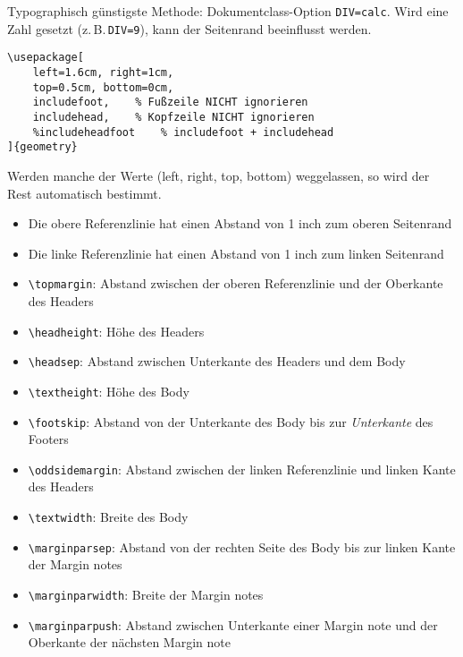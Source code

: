 Typographisch günstigste Methode: Dokumentclass-Option {\green \lstinline|DIV=calc|}.
Wird eine Zahl gesetzt ({z.\,B.\,\green\lstinline|DIV=9|}), kann der Seitenrand beeinflusst werden.


\negAbstand
\begin{lstlisting}
\usepackage[
	left=1.6cm, right=1cm,
	top=0.5cm, bottom=0cm, 
	includefoot,	% Fußzeile NICHT ignorieren
	includehead,	% Kopfzeile NICHT ignorieren
	%includeheadfoot	% includefoot + includehead
]{geometry} 
\end{lstlisting}
Werden manche der Werte (left, right, top, bottom) weggelassen, so wird der Rest automatisch bestimmt.

\label{sec:layout_var}

\footnotesize
\addtolength{\leftmargini}{-10pt}
\begin{itemize}
	\item Die obere Referenzlinie hat einen Abstand von 1 inch zum oberen Seitenrand
	\item Die linke Referenzlinie hat einen Abstand von 1 inch zum linken Seitenrand
	\item \lstinline|\topmargin|: Abstand zwischen der oberen Referenzlinie und der Oberkante des Headers
	\item \lstinline|\headheight|: Höhe des Headers
	\item \lstinline|\headsep|: Abstand zwischen Unterkante des Headers und dem Body
	\item \lstinline|\textheight|: Höhe des Body
	\item \lstinline|\footskip|: Abstand von der Unterkante des Body bis zur \emph{Unterkante} des Footers
	\item \lstinline|\oddsidemargin|: Abstand zwischen der linken Referenzlinie und linken Kante des Headers
	\item \lstinline|\textwidth|: Breite des Body
	\item \lstinline|\marginparsep|: Abstand von der rechten Seite des Body bis zur linken Kante der Margin notes
	\item \lstinline|\marginparwidth|: Breite der Margin notes
	\item \lstinline|\marginparpush|: Abstand zwischen Unterkante einer Margin note und der Oberkante der nächsten Margin note
\end{itemize}
\addtolength{\leftmargini}{10pt}

